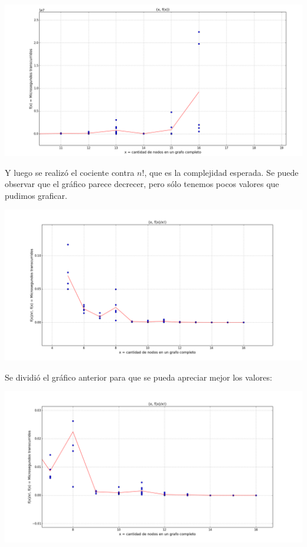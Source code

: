 \begin{center}
	\includegraphics[scale=0.41]{img/exacto/fx_n_11_16.png}
\end{center}

Y luego se realiz\'o el cociente contra $n!$, que es la complejidad esperada. Se puede observar que el gr\'afico parece decrecer, pero s\'olo tenemos pocos valores que pudimos graficar.
\begin{center}
	\includegraphics[scale=0.41]{img/exacto/fact_n.png}
\end{center}

Se dividi\'o el gr\'afico anterior para que se pueda apreciar mejor los valores:
\begin{center}
	\includegraphics[scale=0.41]{img/exacto/fact_n_8_16.png}
\end{center}

